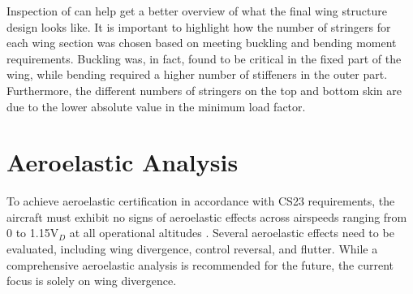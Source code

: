 \begin{table}[H]
    \centering
    \caption{Transposed wing structure parameters, with $x$ [\unit{m}] as the distance from the root}
    \label{tab:wingstructure}
\end{table}

Inspection of  can help get a better overview of what the final wing structure design looks like.
It is important to highlight how the number of stringers for each wing section was chosen based on meeting buckling and bending moment requirements.
Buckling was, in fact, found to be critical in the fixed part of the wing, while bending required a higher number of stiffeners in the outer part.
Furthermore, the different numbers of stringers on the top and bottom skin are due to the lower absolute value in the minimum load factor.

\section{Aeroelastic Analysis}
To achieve aeroelastic certification in accordance with CS23 requirements, the aircraft must exhibit no signs of aeroelastic effects across airspeeds ranging from 0 to 1.15V\(_D\) at all operational altitudes \cite{easa2018easy}. Several aeroelastic effects need to be evaluated, including wing divergence, control reversal, and flutter. While a comprehensive aeroelastic analysis is recommended for the future, the current focus is solely on wing divergence.

